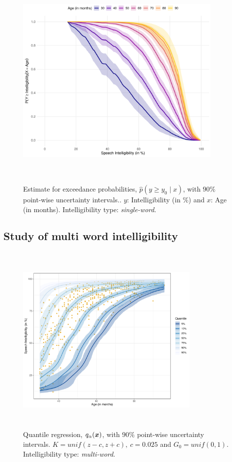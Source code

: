 \documentclass{article}[12pt]
\newcommand{\bx}{\mbox{\boldmath $x$}}
\begin{document}
\begin{figure}[H]
    \centering
    \includegraphics[width = 0.9\textwidth, height = 11cm]{plots/exceedanceRDS3SingleWord.pdf}
    \caption{Estimate for exceedance probabilities, $\widehat p(y \geq y_0 \mid x)$, with $90\%$ point-wise uncertainty intervals.. $y$: Intelligibility (in $\%$) and $x$: Age (in months). Intelligibility type: \textit{single-word}.}
    \label{fig:3}
\end{figure}


\subsection{%
Study of multi word intelligibility}

\begin{figure}[H]
    \centering
    \includegraphics[width = 0.8\textwidth, height = 9.5cm]{plots/quantilesRDS3MultiWord.pdf}
    \caption{Quantile regression, $q_{\alpha}(\bx)$, with $90\%$ point-wise uncertainty intervals. $K = unif(z - c, z + c), \ c = 0.025$ and $G_0 = unif(0, 1)$. Intelligibility type: \textit{multi-word}.}
    \label{fig:4}
\end{figure}
\end{document}
